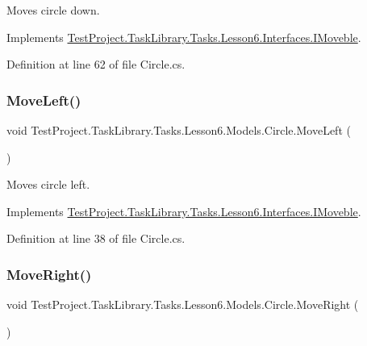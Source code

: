 Moves circle down. 



Implements \mbox{\hyperlink{interface_test_project_1_1_task_library_1_1_tasks_1_1_lesson6_1_1_interfaces_1_1_i_moveble_a23443cd54657cc981a48ef7f9904185d}{Test\+Project.\+Task\+Library.\+Tasks.\+Lesson6.\+Interfaces.\+I\+Moveble}}.



Definition at line 62 of file Circle.\+cs.

\mbox{\label{class_test_project_1_1_task_library_1_1_tasks_1_1_lesson6_1_1_models_1_1_circle_ae827e79380443cdad964c963c3debdc8}} 
\subsubsection{\texorpdfstring{MoveLeft()}{MoveLeft()}}
{\footnotesize\ttfamily void Test\+Project.\+Task\+Library.\+Tasks.\+Lesson6.\+Models.\+Circle.\+Move\+Left (\begin{DoxyParamCaption}{ }\end{DoxyParamCaption})}



Moves circle left. 



Implements \mbox{\hyperlink{interface_test_project_1_1_task_library_1_1_tasks_1_1_lesson6_1_1_interfaces_1_1_i_moveble_a277cd113ed9b4f35228f1c84bb17e91e}{Test\+Project.\+Task\+Library.\+Tasks.\+Lesson6.\+Interfaces.\+I\+Moveble}}.



Definition at line 38 of file Circle.\+cs.

\mbox{\label{class_test_project_1_1_task_library_1_1_tasks_1_1_lesson6_1_1_models_1_1_circle_aa5dc626f3077944c63847ca34e808c9c}} 
\subsubsection{\texorpdfstring{MoveRight()}{MoveRight()}}
{\footnotesize\ttfamily void Test\+Project.\+Task\+Library.\+Tasks.\+Lesson6.\+Models.\+Circle.\+Move\+Right (\begin{DoxyParamCaption}{ }\end{DoxyParamCaption})}



